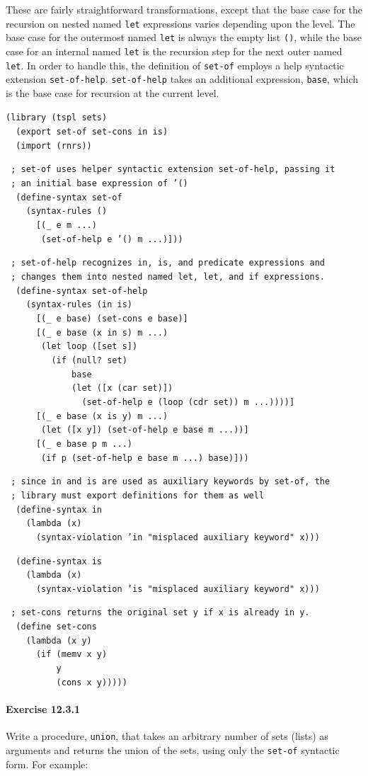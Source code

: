 These are fairly straightforward transformations, except that the
base case for the recursion on nested named \texttt{let} expressions
varies depending upon the level.
The base case for the outermost named \texttt{let} is always the empty
list \texttt{()}, while the base case for an internal named \texttt{let}
is the recursion step for the next outer named \texttt{let}.
In order to handle this, the definition of \texttt{set-of} employs a
help syntactic extension \texttt{set-of-help}.
\texttt{set-of-help} takes an additional expression, \texttt{base}, which
is the base case for recursion at the current level.


\begin{alltt}
(library (tspl sets)
  (export set-of set-cons in is)
  (import (rnrs))

 ; set-of uses helper syntactic extension set-of-help, passing it
 ; an initial base expression of '()
  (define-syntax set-of
    (syntax-rules ()
      [(\_{} e m ...)
       (set-of-help e '() m ...)]))

 ; set-of-help recognizes in, is, and predicate expressions and
 ; changes them into nested named let, let, and if expressions.
  (define-syntax set-of-help
    (syntax-rules (in is)
      [(\_{} e base) (set-cons e base)]
      [(\_{} e base (x in s) m ...)
       (let loop ([set s])
         (if (null? set)
             base
             (let ([x (car set)])
               (set-of-help e (loop (cdr set)) m ...))))]
      [(\_{} e base (x is y) m ...)
       (let ([x y]) (set-of-help e base m ...))]
      [(\_{} e base p m ...)
       (if p (set-of-help e base m ...) base)]))

 ; since in and is are used as auxiliary keywords by set-of, the
 ; library must export definitions for them as well
  (define-syntax in
    (lambda (x)
      (syntax-violation 'in "misplaced auxiliary keyword" x)))

  (define-syntax is
    (lambda (x)
      (syntax-violation 'is "misplaced auxiliary keyword" x)))

 ; set-cons returns the original set y if x is already in y.
  (define set-cons
    (lambda (x y)
      (if (memv x y)
          y
          (cons x y)))))
\end{alltt}

\paragraph{Exercise \label{examples_g166}12.3.1}


\label{examples_s19}Write a procedure, \texttt{union}, that takes an arbitrary number
of sets (lists) as arguments and returns the union of the sets,
using only the \texttt{set-of} syntactic form.
For example:



